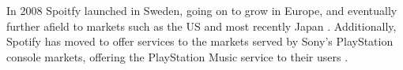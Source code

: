 \par
In 2008 Spoitfy launched in Sweden, going on to grow in Europe, and eventually further afield to markets such as the US and most recently Japan \parencite{spotify_story_so_far, spotify_japan_launch}. Additionally, Spotify has moved to offer services to the markets served by Sony's PlayStation console markets, offering the PlayStation Music service to their users \parencite{spotify_playstation_music_launch}.
